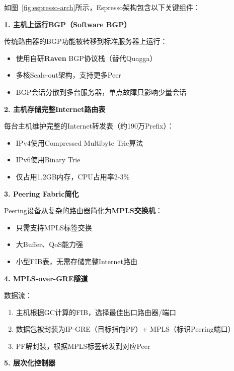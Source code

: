 如图~\ref{fig:espresso-arch}所示，Espresso架构包含以下关键组件：

\textbf{1. 主机上运行BGP（Software BGP）}

传统路由器的BGP功能被转移到标准服务器上运行：
\begin{itemize}
    \item 使用自研\textbf{Raven} BGP协议栈（替代Quagga）
    \item 多核Scale-out架构，支持更多Peer
    \item BGP会话分散到多台服务器，单点故障只影响少量会话
\end{itemize}

\textbf{2. 主机存储完整Internet路由表}

每台主机维护完整的Internet转发表（约190万Prefix）：
\begin{itemize}
    \item IPv4使用Compressed Multibyte Trie算法
    \item IPv6使用Binary Trie
    \item 仅占用1.2GB内存，CPU占用率2-3\%
\end{itemize}

\textbf{3. Peering Fabric简化}

Peering设备从复杂的路由器简化为\textbf{MPLS交换机}：
\begin{itemize}
    \item 只需支持MPLS标签交换
    \item 大Buffer、QoS能力强
    \item 小型FIB表，无需存储完整Internet路由
\end{itemize}

\textbf{4. MPLS-over-GRE隧道}

数据流：
\begin{enumerate}
    \item 主机根据GC计算的FIB，选择最佳出口路由器/端口
    \item 数据包被封装为IP-GRE（目标指向PF）+ MPLS（标识Peering端口）
    \item PF解封装，根据MPLS标签转发到对应Peer
\end{enumerate}

\textbf{5. 层次化控制器}

